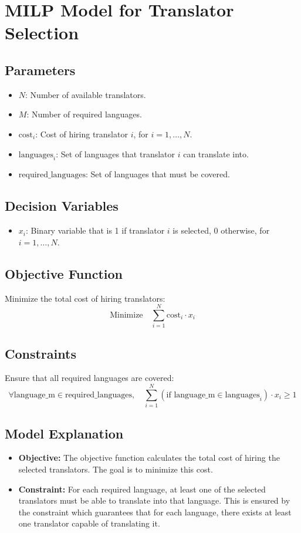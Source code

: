 \documentclass{article}
\begin{document}
\section*{MILP Model for Translator Selection}

\subsection*{Parameters}
\begin{itemize}
    \item $N$: Number of available translators.
    \item $M$: Number of required languages.
    \item $\text{cost}_i$: Cost of hiring translator $i$, for $i = 1, \ldots, N$.
    \item $\text{languages}_i$: Set of languages that translator $i$ can translate into.
    \item $\text{required\_languages}$: Set of languages that must be covered.
\end{itemize}

\subsection*{Decision Variables}
\begin{itemize}
    \item $x_i$: Binary variable that is 1 if translator $i$ is selected, 0 otherwise, for $i = 1, \ldots, N$.
\end{itemize}

\subsection*{Objective Function}
Minimize the total cost of hiring translators:
\[
\text{Minimize} \quad \sum_{i=1}^{N} \text{cost}_i \cdot x_i
\]

\subsection*{Constraints}
Ensure that all required languages are covered:
\[
\forall \text{language\_m} \in \text{required\_languages}, \quad \sum_{i=1}^{N} \left( \text{if language\_m} \in \text{languages}_i \right) \cdot x_i \geq 1
\]

\subsection*{Model Explanation}
\begin{itemize}
    \item \textbf{Objective:} The objective function calculates the total cost of hiring the selected translators. The goal is to minimize this cost.
    \item \textbf{Constraint:} For each required language, at least one of the selected translators must be able to translate into that language. This is ensured by the constraint which guarantees that for each language, there exists at least one translator capable of translating it.
\end{itemize}
\end{document}
